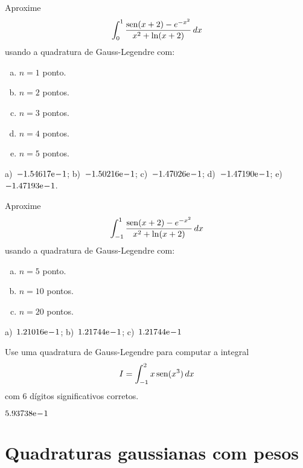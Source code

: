 \begin{exer}
  Aproxime
  \begin{equation}
    \int_{0}^1 \frac{\operatorname{sen}(x+2)-e^{-x^2}}{x^2+\ln(x+2)}\,dx
  \end{equation}
usando a quadratura de Gauss-Legendre com:
\begin{enumerate}[a)]
\item $n=1$ ponto.
\item $n=2$ pontos.
\item $n=3$ pontos.
\item $n=4$ pontos.
\item $n=5$ pontos.
\end{enumerate}
\end{exer}
\begin{resp}
  a)~$-1.54617\mathrm{e}\!-\!1$; b)~$-1.50216\mathrm{e}\!-\!1$; c)~$-1.47026\mathrm{e}\!-\!1$; d)~$-1.47190\mathrm{e}\!-\!1$; e)~$-1.47193\mathrm{e}\!-\!1$.
\end{resp}

\begin{exer}
  Aproxime
  \begin{equation}
    \int_{-1}^1 \frac{\operatorname{sen}(x+2)-e^{-x^2}}{x^2+\ln(x+2)}\,dx
  \end{equation}
usando a quadratura de Gauss-Legendre com:
\begin{enumerate}[a)]
\item $n=5$ ponto.
\item $n=10$ pontos.
\item $n=20$ pontos.
\end{enumerate}
\end{exer}
\begin{resp}
  a)~$1.21016\mathrm{e}\!-\!1$; b)~$1.21744\mathrm{e}\!-\!1$; c)~$1.21744\mathrm{e}\!-\!1$
\end{resp}

\begin{exer}
  Use uma quadratura de Gauss-Legendre para computar a integral
  \begin{equation}
    I = \int_{-1}^2 x\operatorname{sen}(x^3)\,dx
  \end{equation}
  com $6$ dígitos significativos corretos.
\end{exer}
\begin{resp}
  $5.93738\mathrm{e}\!-\!1$
\end{resp}

\section{Quadraturas gaussianas com pesos}\label{cap_integr_sec_Gauss_peso}

